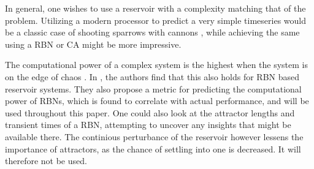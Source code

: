 In general, one wishes to use a reservoir with a complexity matching that of the problem.
Utilizing a modern processor to predict a very simple timeseries would be a classic case of shooting sparrows with cannons \cite{wiki:sparrow},
while achieving the same using a RBN or CA might be more impressive.

The computational power of a complex system is the highest when the system is on the edge of chaos \cite{langton3computation}.
In \cite{rbn-reservoir}, the authors find that this also holds for RBN based reservoir systems.
They also propose a metric for predicting the computational power of RBNs,
which is found to correlate with actual performance,
and will be used throughout this paper.
One could also look at the attractor lengths and transient times of a RBN,
attempting to uncover any insights that might be available there.
The continious perturbance of the reservoir however lessens the importance of attractors,
as the chance of settling into one is decreased.
It will therefore not be used.
